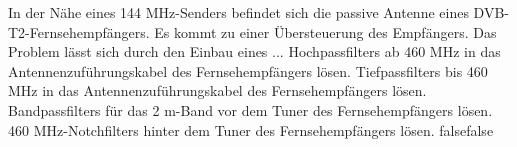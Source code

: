     {In der Nähe eines 144 MHz-Senders befindet sich die passive Antenne eines DVB-T2-Fernsehempfängers. Es kommt zu einer Übersteuerung des Empfängers. Das Problem lässt sich durch den Einbau eines ...}
    {Hochpassfilters ab 460 MHz in das Antennenzuführungskabel des Fernsehempfängers lösen.}
    {Tiefpassfilters bis 460 MHz in das Antennenzuführungskabel des Fernsehempfängers lösen.}
    {Bandpassfilters für das 2 m-Band vor dem Tuner des Fernsehempfängers lösen.}
    {460 MHz-Notchfilters hinter dem Tuner des Fernsehempfängers lösen.}
    {false}{false}